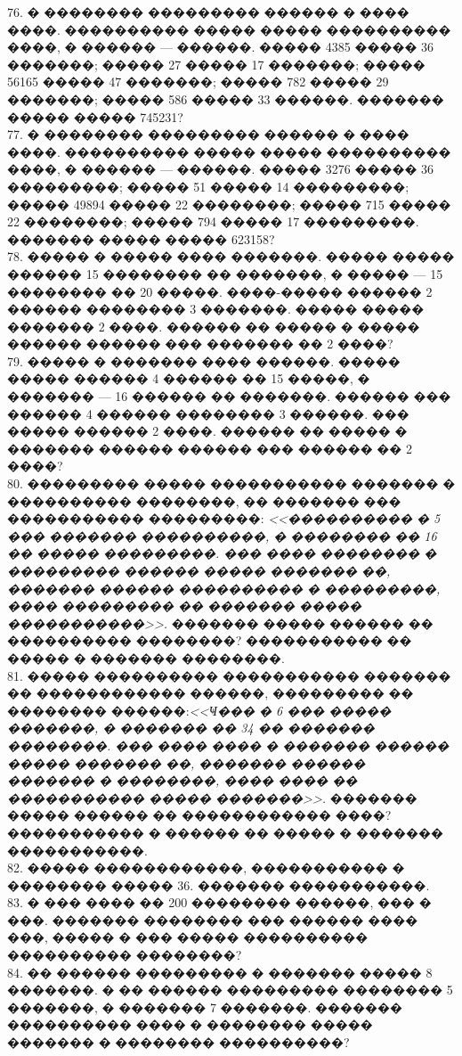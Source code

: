 \documentclass[12pt]{article}
\begin{document}
76. � �������� ��������� ������ � ���� ����. ���������� ����� ����� ���������� ����, � ������ --- ������. ����� 4385 ����� 36 �������; ����� 27 ����� 17 �������; ����� 56165 ����� 47 �������; ����� 782 ����� 29 �������; ����� 586 ����� 33 ������. ������� ����� ����� 745231?\\
77. � �������� ��������� ������ � ���� ����. ���������� ����� ����� ���������� ����, � ������ --- ������. ����� 3276 ����� 36 ���������; ����� 51 ����� 14 ���������; ����� 49894 ����� 22 ��������; ����� 715 ����� 22 ��������; ����� 794 ����� 17 ���������. ������� ����� ����� 623158?\\
78. ����� � ����� ���� �������. ����� ����� ������ 15 �������� �� �������, � ����� --- 15 �������� �� 20 �����. ����-����� ������ 2 ������ �������� 3 �������. ����� ����� ������� 2 ����. ������ �� ����� � ����� ������ ������ ��� ������� �� 2 ����?\\
79. ����� � ������� ���� ������. ����� ����� ������ 4 ������ �� 15 �����, � ������� --- 16 ������ �� �������. ������ ��� ������ 4 ������ �������� 3 ������. ��� ����� ������ 2 ����. ������ �� ����� � ������� ������ ������ ��� ������ �� 2 ����?\\
80. ��������� ����� ����������� ������� � ���������� ��������, �� ������� ��� ����������� ���������: {\it <<���������� � 5 ��� ������� ����������, � �������� �� 16 �� ����� ���������. ��� ���� �������� � ��������� ������ ����� ������� ��, ������� ������ ���������� � ���������, ���� ��������� �� ������� ����� �����������>>.} ������� ����� ������ �� ���������� ��������? ����������� �� ����� � ������� ��������.\\
81. ����� ���������� ����������� ������� �� ������������ ������, ��������� �� �������� ������:{\it <<Ҹ��� � 6 ��� ����� �������, � ������� �� 34 �� ������� ��������. ��� ���� ���� � ������� ������ ����� ������� ��, ������� ������ ������� � ��������, ���� ���� �� ����������� ����� �������>>.} ������� ����� ������ �� ������������ ����? ����������� � ������ �� ����� � ������� �����������.\\
82. ����� ������������, ����������� � �������� ����� 36. ������� �����������.\\
83. � ��� ���� �� 200 �������� ������, ��� � ���. ������� �������� ��� ������ ���� ���, ����� � ��� ����� ���������� ���������� ��������?\\
84. �� ������ ��������� � ������� ����� 8 �������. � �� ������ ��������� �������� 5 �������, � ������� 7 �������. ������� ���������� ���� �  �������� ����� ������� � �������� ����������?\\
\end{document}

